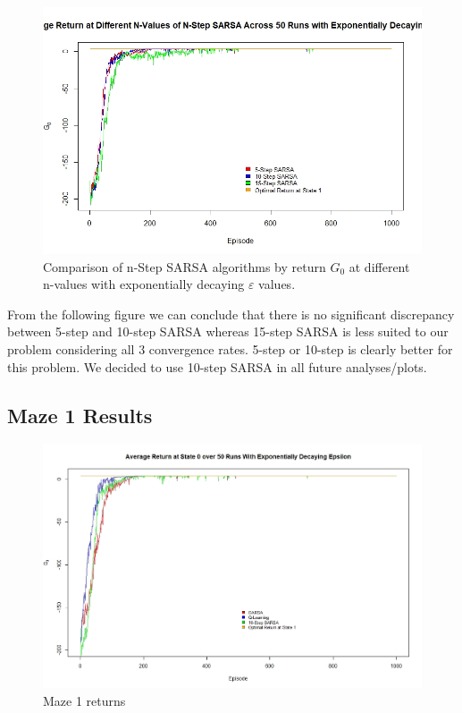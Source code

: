 \documentclass[final,12pt,3p]{elsarticle}
\begin{document}
\begin{figure}[H]
    \centering
    \caption{Comparison of n-Step SARSA algorithms by return $G_0$ at different n-values with exponentially decaying $\varepsilon$ values.}
    \includegraphics[trim=0 0 0 1.5cm, clip, width=14cm]{figures/5StepVS10StepVS15Step.jpeg}
\end{figure}

From the following figure we can conclude that there is no significant discrepancy between 5-step and 10-step SARSA whereas 15-step SARSA is less suited to our problem considering all 3 convergence rates. 5-step or 10-step is clearly better for this problem. We decided to use 10-step SARSA in all future analyses/plots.

\subsection{Maze 1 Results}

\begin{figure}[H]
    \centering
    \caption{Maze 1 returns}
    \includegraphics[width=14cm]{figures/Maze1.jpeg}
\end{figure}
\end{document}

